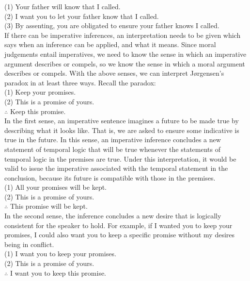 \documentclass[12pt]{article}
\begin{document}
(1) Your father will know that I called.\\
\indent
(2) I want you to let your father know that I called.\\
\indent
(3) By assenting, you are obligated to ensure your father knows I called.\\

If there can be imperative inferences, an interpretation needs to be given which says when an inference can be applied, and what it means. Since moral judgements entail imperatives, we need to know the sense in which an imperative argument describes or compels, so we know the sense in which a moral argument describes or compels. With the above senses, we can interpret Jørgensen's paradox in at least three ways. Recall the paradox:\\

(1) Keep your promises.\\
\indent
(2) This is a promise of yours.\\
\indent
$\therefore$ Keep this promise.\\

In the first sense, an imperative sentence imagines a future to be made true by describing what it looks like. That is, we are asked to ensure some indicative is true in the future. In this sense, an imperative inference concludes a new statement of temporal logic that will be true whenever the statements of temporal logic in the premises are true. Under this interpretation, it would be valid to issue the imperative associated with the temporal statement in the conclusion, because its future is compatible with those in the premises.\\

(1) All your promises will be kept.\\
\indent
(2) This is a promise of yours.\\
\indent
$\therefore$ This promise will be kept.\\

In the second sense, the inference concludes a new desire that is logically consistent for the speaker to hold. For example, if I wanted you to keep your promises, I could also want you to keep a specific promise without my desires being in conflict.\\

(1) I want you to keep your promises.\\
\indent
(2) This is a promise of yours.\\
\indent
$\therefore$ I want you to keep this promise.\\
\end{document}
